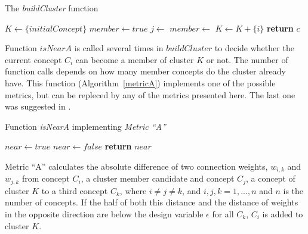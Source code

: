 \documentclass[graybox]{svmult}
\begin{document}
\begin{algorithm}
  \caption{The \emph{buildCluster} function}\label{buildCluster}
  \begin{algorithmic}[1]
    \State $K\gets \{initialConcept\}$
        \State $member \gets true$
          \State $j \gets$ 
          \State $member \gets$ 
        \EndWhile
          \State $K \gets K + \{i\}$
        \EndIf
      \EndIf
    \EndFor
    \State \textbf{return} $c$
    \EndFunction
  \end{algorithmic}
\end{algorithm}

Function $isNearA$ is called several times in $buildCluster$ to decide whether the current concept $C_i$ can become a member of cluster $K$ or not. The number of function calls depends on how many member concepts do the cluster already have. This function (Algorithm~\ref{metricA}) implements one of the possible metrics, but can be repleced by any of the metrics presented here. The last one was suggested in \cite{hatwagnerm.f.koczyl.t.2015}.

\begin{algorithm}
  \caption{Function \emph{isNearA} implementing \emph{Metric ``A''}}\label{metricA}
  \begin{algorithmic}[1]
      \State $near \gets true$
            \State $near \gets false$
          \EndIf
        \EndIf
      \EndFor
      \State \textbf{return} $near$
    \EndFunction
  \end{algorithmic}
\end{algorithm}

Metric ``A'' calculates the absolute difference of two connection weights, $w_{i,k}$ and $w_{j,k}$ from concept $C_i$, a cluster member candidate and concept $C_j$, a concept of cluster $K$ to a third concept $C_k$, where $i \ne j \ne k$, and $i, j, k = 1, ..., n$ and $n$ is the number of concepts. If the half of both this distance and the distance of weights in the opposite direction are below the design variable $\epsilon$ for all $C_k$, $C_i$ is added to cluster $K$.
\end{document}
